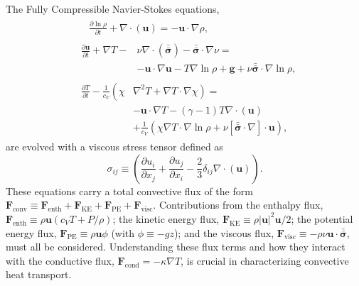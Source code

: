 \documentclass[aps, prl, twocolumn, nofootinbib, groupedaddress, amsfonts, amssymb, amsmath]{revtex4-1}
\newcommand{\Div}[1]{\ensuremath{\nabla\cdot\left( #1\right)}}
\newcommand{\grad}{\ensuremath{\nabla}}
\newcommand{\lilstressT}{\ensuremath{\bm{\bar{\bar{\sigma}}}}}
\begin{document}
The Fully Compressible Navier-Stokes equations,
\begin{align}
&\begin{aligned}
&\frac{\partial \ln\rho}{\partial t} + \Div{\bm{u}} = -\bm{u}\cdot\grad\rho,
	\label{eqn:continuity_eqn}
\end{aligned}\\
&\begin{aligned}
\frac{\partial\bm{u}}{\partial t} + \grad T - &\nu\Div{\lilstressT} - \lilstressT\cdot\grad\nu = \\
&-\bm{u}\cdot\grad\bm{u} - T\grad\ln\rho + \bm{g} + \nu\lilstressT\cdot\grad\ln\rho,
\label{eqn:momentum_eqn}
\end{aligned}\\
&\begin{aligned}
\frac{\partial T}{\partial t} -\frac{1}{c_V}\left(\right.\chi&\left.\grad^2 T + \grad T\cdot\grad\chi\right) = \\
	&-\bm{u}\cdot\grad T - (\gamma-1)T\Div{\bm{u}} \\
	&+ \frac{1}{c_V}\left(\chi\grad T \cdot\grad\ln\rho +\nu\left[\lilstressT\cdot\nabla\right]\cdot\bm{u}\right), 
	\label{eqn:energy_eqn}
\end{aligned}
\end{align}
are evolved with a viscous stress tensor defined as
\begin{equation}
\sigma_{ij} \equiv \left(\frac{\partial u_i}{\partial x_j} + \frac{\partial u_j}{\partial x_i} - \frac{2}{3}\delta_{ij}\Div{\bm{u}}\right).
	\label{eqn:stress_tensor}
\end{equation}
These equations carry a total convective flux of the form
$
\bm{F}_{\text{conv}} \equiv \bm{F}_{\text{enth}} + \bm{F}_{\text{KE}} + \bm{F}_{\text{PE}} + \bm{F}_{\text{visc}}.
$
Contributions from the enthalpy flux, $\bm{F}_{\text{enth}} \equiv \rho\bm{u}(c_V T + P/\rho)$;
the kinetic energy flux, $\bm{F}_{\text{KE}} \equiv \rho|\bm{u}|^2\bm{u}/2$;
the potential energy flux, $\bm{F}_{\text{PE}} \equiv \rho\bm{u}\phi$ (with $\phi \equiv -gz$);
and the viscous flux, $\bm{F}_{\text{visc}} \equiv -\rho\nu\bm{u}\cdot\lilstressT$, must all be considered. 
Understanding these flux terms and how they interact with the conductive flux, 
$\bm{F}_{\text{cond}} = -\kappa \grad T$, is crucial in characterizing
convective heat transport.
\end{document}
